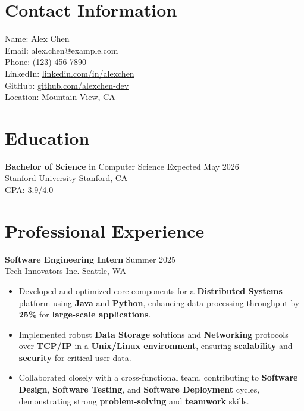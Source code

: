 \documentclass[11pt,a4paper,sans]{article}
\begin{document}
\section*{Contact Information}
Name: Alex Chen \\
Email: alex.chen@example.com \\
Phone: (123) 456-7890 \\
LinkedIn: \href{https://www.linkedin.com/in/alexchen}{linkedin.com/in/alexchen} \\
GitHub: \href{https://github.com/alexchen-dev}{github.com/alexchen-dev} \\
Location: Mountain View, CA

\section*{Education}
\textbf{Bachelor of Science} in Computer Science \hfill Expected May 2026 \\
Stanford University \hfill Stanford, CA \\
GPA: 3.9/4.0

\section*{Professional Experience}
\textbf{Software Engineering Intern} \hfill Summer 2025 \\
Tech Innovators Inc. \hfill Seattle, WA
\begin{itemize}[leftmargin=*]
    \item Developed and optimized core components for a \textbf{Distributed Systems} platform using \textbf{Java} and \textbf{Python}, enhancing data processing throughput by \textbf{25\%} for \textbf{large-scale applications}.
    \item Implemented robust \textbf{Data Storage} solutions and \textbf{Networking} protocols over \textbf{TCP/IP} in a \textbf{Unix/Linux environment}, ensuring \textbf{scalability} and \textbf{security} for critical user data.
    \item Collaborated closely with a cross-functional team, contributing to \textbf{Software Design}, \textbf{Software Testing}, and \textbf{Software Deployment} cycles, demonstrating strong \textbf{problem-solving} and \textbf{teamwork} skills.
\end{itemize}
\end{document}
